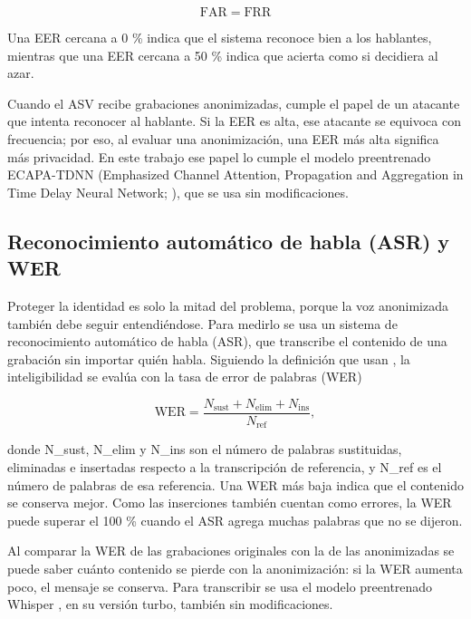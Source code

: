 \documentclass[10pt,twocolumn]{article}
\newcommand{\textcite}[1]{\citet{#1}}
\newcommand{\parencite}[1]{\citep{#1}}
\begin{document}
\begin{equation}\label{eq:eer}
\mathrm{FAR} = \mathrm{FRR}
\end{equation}

\noindent Una EER cercana a 0 \% indica que el sistema reconoce bien a los hablantes, mientras que una EER cercana a 50 \% indica que acierta como si decidiera al azar.

Cuando el ASV recibe grabaciones anonimizadas, cumple el papel de un atacante que intenta reconocer al hablante. Si la EER es alta, ese atacante se equivoca con frecuencia; por eso, al evaluar una anonimización, una EER más alta significa más privacidad. En este trabajo ese papel lo cumple el modelo preentrenado ECAPA-TDNN (Emphasized Channel Attention, Propagation and Aggregation in Time Delay Neural Network; \citealp{desplanques2020,speechbrainModel}), que se usa sin modificaciones.

\subsection{Reconocimiento automático de habla (ASR) y WER}\label{sec:2.4}

Proteger la identidad es solo la mitad del problema, porque la voz anonimizada también debe seguir entendiéndose. Para medirlo se usa un sistema de reconocimiento automático de habla (ASR), que transcribe el contenido de una grabación sin importar quién habla. Siguiendo la definición que usan \textcite{deng2023}, la inteligibilidad se evalúa con la tasa de error de palabras (WER)

\begin{equation}\label{eq:wer}
\mathrm{WER} = \frac{N_{\mathrm{sust}} + N_{\mathrm{elim}} + N_{\mathrm{ins}}}{N_{\mathrm{ref}}},
\end{equation}

\noindent donde N\_sust, N\_elim y N\_ins son el número de palabras sustituidas, eliminadas e insertadas respecto a la transcripción de referencia, y N\_ref es el número de palabras de esa referencia. Una WER más baja indica que el contenido se conserva mejor. Como las inserciones también cuentan como errores, la WER puede superar el 100 \% cuando el ASR agrega muchas palabras que no se dijeron.

Al comparar la WER de las grabaciones originales con la de las anonimizadas se puede saber cuánto contenido se pierde con la anonimización: si la WER aumenta poco, el mensaje se conserva. Para transcribir se usa el modelo preentrenado Whisper \parencite{radford2023,openaiwhisper2025}, en su versión turbo, también sin modificaciones.
\end{document}
